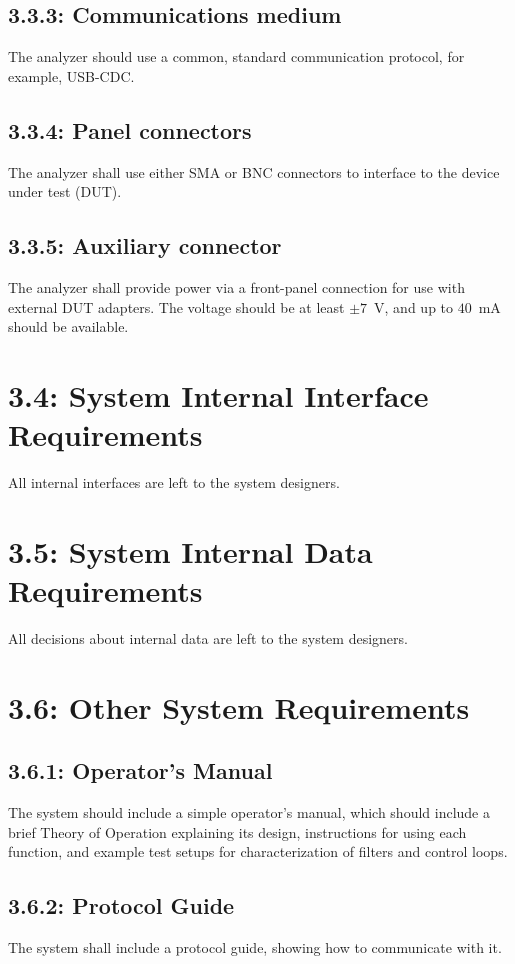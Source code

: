 \subsection*{3.3.3: Communications medium}
\label{prs:3.3.3}
The analyzer should use a common, standard communication protocol, for example, USB-CDC.

\subsection*{3.3.4: Panel connectors}
\label{prs:3.3.4}
The analyzer shall use either SMA or BNC connectors to interface to the device under test (DUT).

\subsection*{3.3.5: Auxiliary connector}
\label{prs:3.3.5}
The analyzer shall provide power via a front-panel connection for use with external DUT
adapters. The voltage should be at least $\pm 7$~V, and up to $40$~mA should be available.

\section*{3.4: System Internal Interface Requirements}
All internal interfaces are left to the system designers.

\section*{3.5: System Internal Data Requirements}
All decisions about internal data are left to the system designers.

\section*{3.6: Other System Requirements}

\subsection*{3.6.1: Operator's Manual}
\label{prs:3.6.1}
The system should include a simple operator's manual, which should include a brief
Theory of Operation explaining its design, instructions for using each function,
and example test setups for characterization of filters and control loops.

\subsection*{3.6.2: Protocol Guide}
\label{prs:3.6.2}
The system shall include a protocol guide, showing how to communicate with it.

